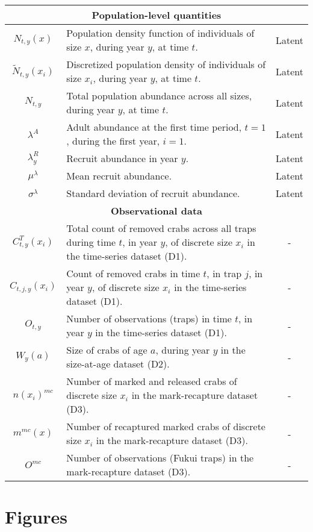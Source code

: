 \documentclass{article}
\begin{document}
\begin{longtable}{||c p{9cm} c||}
 \hline\hline
 \multicolumn{3}{||c||}{\textbf{Population-level quantities}} \\ 
 \hline
 $N_{t,y}(x)$ & Population density function of individuals of size $x$, during year $y$, at time $t$. & Latent \\ 
 \hline
 $\tilde{N}_{t,y}(x_i)$ & Discretized population density of individuals of size $x_i$, during year $y$, at time $t$. & Latent \\ 
 \hline
 $N_{t,y}$ & Total population abundance across all sizes, during year $y$, at time $t$. & Latent \\
 \hline
 $\lambda^A$ & Adult abundance at the first time period, $t=1$, during the first year, $i=1$. & Latent \\
 \hline
 $\lambda^R_y$ & Recruit abundance in year $y$. & Latent \\
 \hline
 $\mu^{\lambda}$ & Mean recruit abundance. & Latent \\
 \hline
 $\sigma^{\lambda}$ & Standard deviation of recruit abundance. & Latent \\
 \hline\hline
 \multicolumn{3}{||c||}{\textbf{Observational data}} \\ 
 \hline
 $C^T_{t,y}(x_i)$ & Total count of removed crabs across all traps during time $t$, in year $y$, of discrete size $x_i$ in the time-series dataset (D1). & - \\ 
 \hline
 $C_{t,j,y}(x_i)$ & Count of removed crabs in time $t$, in trap $j$, in year $y$, of discrete size $x_i$ in the time-series dataset (D1). & - \\
 \hline
 $O_{t,y}$ & Number of observations (traps) in time $t$, in year $y$ in the time-series dataset (D1). & - \\
 \hline
 $W_{y}(a)$ & Size of crabs of age $a$, during year $y$ in the size-at-age dataset (D2). & - \\
 \hline
 $n(x_i)^{mc}$ & Number of marked and released crabs of discrete size $x_i$ in the mark-recapture dataset (D3). & - \\
 \hline
 $m^{mc}(x)$ & Number of recaptured marked crabs of discrete size $x_i$ in the mark-recapture dataset (D3). & - \\
 \hline
 $O^{mc}$ & Number of observations (Fukui traps) in the mark-recapture dataset (D3). & - \\
 \hline
\end{longtable}

\section{Figures}
\end{document}
